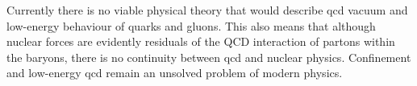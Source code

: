 Currently there is no viable physical theory that would describe \gls{qcd} vacuum and low-energy behaviour of quarks and gluons. This also means that although nuclear forces are evidently residuals of the QCD interaction of partons within the baryons, there is no continuity between \gls{qcd} and nuclear physics. Confinement and low-energy \gls{qcd} remain an unsolved problem of modern physics. 


